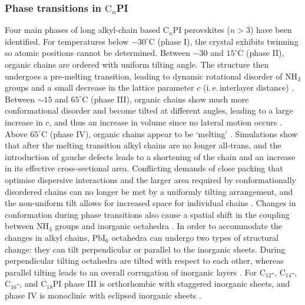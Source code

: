 \subsubsection{Phase transitions in $\textrm{C}_n$PI}
\label{sec:Cnphases}
Four main phases of long alkyl-chain based $\textrm{C}_n$PI perovskites ($n>3$) have been identified. For temperatures below $-30^{\circ}$C (phase I), the crystal exhibits twinning so atomic positions cannot be determined. Between $-30$ and $15^{\circ}$C  (phase II), organic chains are ordered with uniform tilting angle. The structure then undergoes a pre-melting transition, leading to dynamic rotational disorder of $\textrm{NH}_3$ groups and a small decrease in the lattice parameter $c$ (i.\,e.\,interlayer distance) \cite{Barman2003}. Between $\sim 15$ and $65^{\circ}$C (phase III), organic chains show much more conformational disorder and become tilted at different angles, leading to a large increase in $c$, and thus an increase in volume since no lateral motion occurs \cite{Barman2003}. Above $65^{\circ}$C (phase IV), organic chains appear to be `melting' \cite{Ishihara1990, Xu1991, Ishihara1989}. Simulations show that after the melting transition alkyl chains are no longer all-trans, and the introduction of gauche defects leads to a shortening of the chain and an increase in its effective cross-sectional area. Conflicting demands of close packing that optimise dispersive interactions and the larger area required by conformationally disordered chains can no longer be met by a uniformly tilting arrangement, and the non-uniform tilt allows for increased space for individual chains \cite{Naik2010}. Changes in conformation during phase transitions also cause a spatial shift in the coupling between $\textrm{NH}_3$ groups and inorganic octahedra \cite{Pradeesh2009}. In order to accommodate the changes in alkyl chains, $\textrm{PbI}_6$ octahedra can undergo two types of structural change: they can tilt perpendicular or parallel to the inorganic sheets. During perpendicular tilting octahedra are tilted with respect to each other, whereas parallel tilting leads to an overall corrugation of inorganic layers \cite{Billing2008}. For $\textrm{C}_{12}$-, $\textrm{C}_{14}$-, $\textrm{C}_{16}$-, and $\textrm{C}_{18}$PI phase III is orthorhombic with staggered inorganic sheets, and phase IV is monoclinic with eclipsed inorganic sheets \cite{Billing2008}.    

